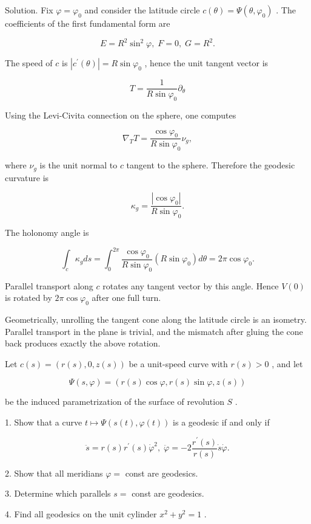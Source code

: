 \documentclass[10pt]{article}
\begin{document}
Solution. Fix \(\varphi  = {\varphi }_{0}\) and consider the latitude circle \(c\left( \theta \right)  = \Psi \left( {\theta ,{\varphi }_{0}}\right)\) . The coefficients of the first fundamental form are

\[
E = {R}^{2}{\sin }^{2}\varphi ,\;F = 0,\;G = {R}^{2}.
\]

The speed of \(c\) is \(\left| {{c}^{\prime }\left( \theta \right) }\right|  = R\sin {\varphi }_{0}\) , hence the unit tangent vector is

\[
T = \frac{1}{R\sin {\varphi }_{0}}{\partial }_{\theta }
\]

Using the Levi-Civita connection on the sphere, one computes

\[
{\nabla }_{T}T = \frac{\cos {\varphi }_{0}}{R\sin {\varphi }_{0}}{\nu }_{g},
\]

where \({\nu }_{g}\) is the unit normal to \(c\) tangent to the sphere. Therefore the geodesic curvature is

\[
{\kappa }_{g} = \frac{\left| \cos {\varphi }_{0}\right| }{R\sin {\varphi }_{0}}.
\]

The holonomy angle is

\[
{\int }_{c}{\kappa }_{g}{ds} = {\int }_{0}^{2\pi }\frac{\cos {\varphi }_{0}}{R\sin {\varphi }_{0}}\left( {R\sin {\varphi }_{0}}\right) {d\theta } = {2\pi }\cos {\varphi }_{0}.
\]

Parallel transport along \(c\) rotates any tangent vector by this angle. Hence \(V\left( 0\right)\) is rotated by \({2\pi }\cos {\varphi }_{0}\) after one full turn.

Geometrically, unrolling the tangent cone along the latitude circle is an isometry. Parallel transport in the plane is trivial, and the mismatch after gluing the cone back produces exactly the above rotation.

\begin{problem}[title=PROBLEM 2 (8 POINTS)]
Let \(c\left( s\right)  = \left( {r\left( s\right) ,0,z\left( s\right) }\right)\) be a unit-speed curve with \(r\left( s\right)  > 0\) , and let

\[
\Psi \left( {s,\varphi }\right)  = \left( {r\left( s\right) \cos \varphi ,r\left( s\right) \sin \varphi ,z\left( s\right) }\right)
\]

be the induced parametrization of the surface of revolution \(S\) .

1. Show that a curve \(t \mapsto  \Psi \left( {s\left( t\right) ,\varphi \left( t\right) }\right)\) is a geodesic if and only if

\[
\ddot{s} = r\left( s\right) {r}^{\prime }\left( s\right) {\dot{\varphi }}^{2},\;\ddot{\varphi } =  - 2\frac{{r}^{\prime }\left( s\right) }{r\left( s\right) }\dot{s}\dot{\varphi }.
\]

2. Show that all meridians \(\varphi  =\) const are geodesics.

3. Determine which parallels \(s =\) const are geodesics.

4. Find all geodesics on the unit cylinder \({x}^{2} + {y}^{2} = 1\) .
\end{problem}
\end{document}

